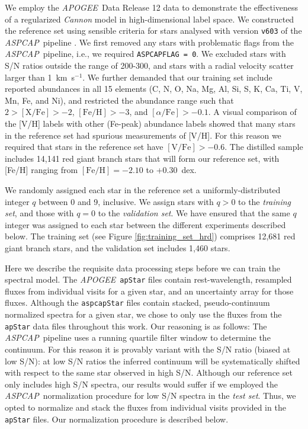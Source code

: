 \documentclass[12pt,preprint]{aastex6}
\newcommand{\project}[1]{\textsl{#1}}
\newcommand{\acronym}[1]{{\small{#1}}}
\newcommand{\apogee}{\project{\acronym{APOGEE}}}
\newcommand{\aspcap}{\project{\acronym{ASPCAP}}}
\begin{document}
We employ the \apogee\ Data Release 12 data \citep{Alam_2015} to demonstrate the effectiveness of
a regularized \emph{Cannon} model in high-dimensional label space.  We 
constructed the reference set using sensible criteria for stars analysed with 
version \texttt{v603} of the \aspcap\ pipeline \citep{Holtzman_2015,Garcia_Perez_2015}.  We first removed 
any stars with problematic flags from the \aspcap\ pipeline, i.e., we required 
\texttt{ASPCAPFLAG~=~0}.  We excluded stars with S/N ratios outside the range of
200-300, and stars with a radial velocity scatter larger than 1~km~s$^{-1}$.  We
further demanded that our training set include reported abundances in all 15 
elements (C, N, O, Na, Mg, Al, Si, S, K, Ca, Ti, V, Mn, Fe, and Ni), and 
restricted the abundance range such that $2 > \mathrm{[X/Fe]} > -2$, 
$\mathrm{[Fe/H]} > -3$, and $[\alpha/\mathrm{Fe}] > -0.1$.  A visual comparison 
of the [V/H] labels with other (Fe-peak) abundance labels showed that many stars
in the reference set had spurious measurements of [V/H].  For this reason we 
required that stars in the reference set have $\mathrm{[V/Fe]} > -0.6$.  The 
distilled sample includes 14,141 red giant branch stars that will form our 
reference set, with [Fe/H] ranging from $\mathrm{[Fe/H]} = -2.10$ to 
+0.30~dex.


We randomly assigned each star in the reference set a uniformly-distributed 
integer $q$ between 0 and 9, inclusive.  We assign stars with $q > 0$
 to the \emph{training set}, and those with $q = 0$ to the \emph{validation set}. We have ensured that the same $q$ integer was assigned to each star 
between the different experiments described below.  The training set (see Figure
\ref{fig:training_set_hrd}) comprises 12,681 red giant branch stars, and the 
validation set includes 1,460 stars.


Here we describe the requisite data processing steps before we can train the 
spectral model.  The \apogee\ \texttt{apStar} files contain rest-wavelength, 
resampled fluxes from individual visits for a given star, and an uncertainty array for
those fluxes.  Although the \texttt{aspcapStar} files contain stacked, 
pseudo-continuum normalized spectra for a given star, we chose to only use the 
fluxes from the \texttt{apStar} data files throughout this work.  Our reasoning 
is as follows: The \aspcap\ pipeline uses a running quartile filter window to determine 
the continuum.  For this reason it is provably variant with the S/N ratio (biased at low S/N): at 
low S/N ratios the inferred continuum will be systematically shifted with 
respect to the same star observed in high S/N.  Although our reference set only 
includes high S/N spectra, our results would suffer if we employed the \aspcap\ 
normalization procedure for low S/N spectra in the \emph{test set}.  Thus, we 
opted to normalize and stack the fluxes from individual visits provided in the 
\texttt{apStar} files. Our normalization procedure is described below.
\end{document}
